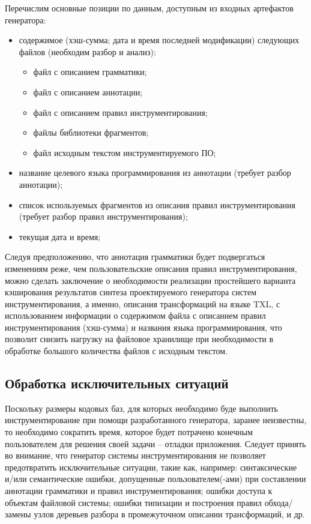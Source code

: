 Перечислим основные позиции по данным, доступным из входных артефактов генератора:
\begin{itemize}[noitemsep]
  \item содержимое (хэш-сумма; дата и время последней модификации) следующих файлов (необходим разбор и анализ):
    \begin{itemize}[noitemsep]
      \item файл с описанием грамматики;
      \item файл с описанием аннотации;
      \item файл с описанием правил инструментирования;
      \item файлы библиотеки фрагментов;
      \item файл исходным текстом инструментируемого ПО;
    \end{itemize}
  \item название целевого языка программирования из аннотации (требует разбор аннотации);
  \item список используемых фрагментов из описания правил инструментирования (требует разбор правил инструментирования);
  \item текущая дата и время;
\end{itemize}

Следуя предположению, что аннотация грамматики будет подвергаться изменениям реже, чем пользовательские описания правил инструментирования, можно сделать заключение о необходимости реализации простейшего варианта кэширования результатов синтеза проектируемого генератора систем инструментирования, а именно, описания трансформаций на языке TXL, с использованием информации о содержимом файла с описанием правил инструментирования (хэш-сумма) и названия языка программирования, что позволит снизить нагрузку на файловое хранилище при необходимости в обработке большого количества файлов с исходным текстом.

\subsection{Обработка исключительных ситуаций}

Поскольку размеры кодовых баз, для которых необходимо буде выполнить инструментирование при помощи разработанного генератора, заранее неизвестны, то необходимо сократить время, которое будет потрачено конечным пользователем для решения своей задачи -- отладки приложения.
Следует принять во внимание, что генератор системы инструментирования не позволяет предотвратить исключительные ситуации, такие как, например: синтаксические и/или семантические ошибки, допущенные пользователем(-ами) при составлении аннотации грамматики и правил инструментирования; ошибки доступа к объектам файловой системы; ошибки типизации и построения правил обхода/замены узлов деревьев разбора в промежуточном описании трансформаций, и др.

